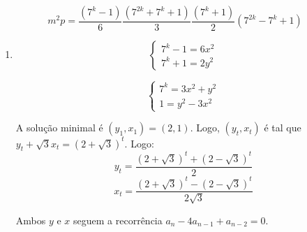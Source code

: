 \documentclass[10pt, a4paper]{article}
\begin{document}
\begin{itemize}
		\[ m^2 p = \frac{(7^k-1)}{6} \frac{(7^{2k} + 7^k + 1)}{3} \frac{(7^k+1)}{2} (7^{2k} - 7^k + 1)\]

		\begin{enumerate}[label = \textbf{Caso \Roman*.}]
			\item \[\begin{cases}7^k - 1 = 6x^2 \\ 7^k + 1 = 2y^2\end{cases}\]

				\[\begin{cases} 7^k = 3x^2 + y^2 \\ 1 = y^2 - 3x^2 \end{cases}\]

				A solução minimal é $(y_1, x_1) = (2, 1)$. Logo, $(y_t, x_t)$ é tal que $y_t + \sqrt{3} x_t = \left(2 + \sqrt{3}\right)^t$. Logo:
				\[y_t = \frac{(2 + \sqrt{3})^t + (2-\sqrt{3})^t}{2}\]
				\[x_t = \frac{(2 + \sqrt{3})^t - (2-\sqrt{3})^t}{2\sqrt{3}}\]

				Ambos $y$ e $x$ seguem a recorrência $a_n - 4a_{n-1} + a_{n-2} = 0$.
		\end{enumerate}

		

		\newpage





	\end{itemize}



	
\end{document}
